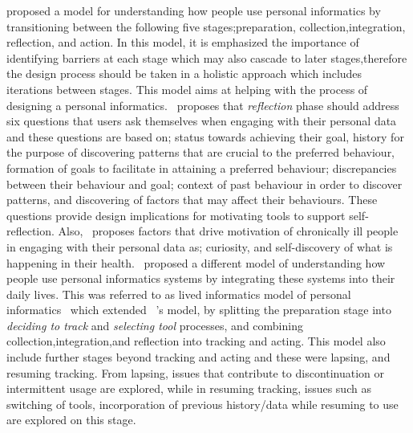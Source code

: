 \cite{li2010stage} proposed a model for understanding how people use personal informatics by transitioning between the following five stages;preparation, collection,integration, reflection, and action. In this model, it is emphasized the importance of identifying barriers at each stage which may also cascade to later stages,therefore the design process should be taken in a holistic approach which includes iterations between stages. This model aims at helping with the process of designing a personal informatics.~\cite{li2011understanding} proposes that \emph{reflection} phase should address six questions that users ask themselves when engaging with their personal data and these questions are based on; status towards achieving  their goal, history for the purpose of discovering patterns that are crucial  to the preferred behaviour, formation of goals to facilitate in attaining a preferred behaviour; discrepancies between their behaviour and goal; context of past behaviour in order to discover patterns, and discovering of factors that may affect their behaviours. These questions provide design implications for motivating tools to support self-reflection. Also,~\cite{macleod2013personal} proposes factors that drive motivation of chronically ill people in engaging with their personal data as; curiosity, and self-discovery of what is happening in their health.~\cite{epstein2015lived} proposed a different model of understanding how people use personal informatics systems by integrating these systems into their daily lives. This was referred to as lived informatics model of personal informatics~\citep{epstein2015lived} which extended  ~\cite{li2010stage}'s model, by splitting the preparation stage into \emph{deciding to track} and \emph{selecting tool} processes, and combining collection,integration,and reflection into tracking and acting. This model also include further stages beyond tracking and acting and these were lapsing, and resuming tracking.  From lapsing, issues that contribute to discontinuation or intermittent usage are explored, while in resuming tracking, issues such as switching of tools, incorporation of previous history/data while resuming to use are explored on this stage.  

